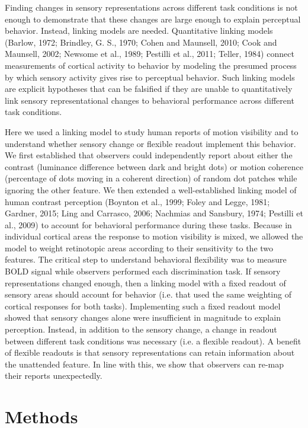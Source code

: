 \documentclass{report}
\begin{document}
Finding changes in sensory representations across different task conditions is not enough to demonstrate that these changes are large enough to explain perceptual behavior.  Instead, linking models are needed. Quantitative linking models (Barlow, 1972; Brindley, G. S., 1970; Cohen and Maunsell, 2010; Cook and Maunsell, 2002; Newsome et al., 1989; Pestilli et al., 2011; Teller, 1984) connect measurements of cortical activity to behavior by modeling the presumed process by which sensory activity gives rise to perceptual behavior. Such linking models are explicit hypotheses that can be falsified if they are unable to quantitatively link sensory representational changes to behavioral performance across different task conditions.

Here we used a linking model to study human reports of motion visibility and to understand whether sensory change or flexible readout implement this behavior. We first established that observers could independently report about either the contrast (luminance difference between dark and bright dots) or motion coherence (percentage of dots moving in a coherent direction) of random dot patches while ignoring the other feature. We then extended a well-established linking model of human contrast perception (Boynton et al., 1999; Foley and Legge, 1981; Gardner, 2015; Ling and Carrasco, 2006; Nachmias and Sansbury, 1974; Pestilli et al., 2009) to account for behavioral performance during these tasks. Because in individual cortical areas the response to motion visibility is mixed, we allowed the model to weight retinotopic areas according to their sensitivity to the two features. The critical step to understand behavioral flexibility was to measure BOLD signal while observers performed each discrimination task. If sensory representations changed enough, then a linking model with a fixed readout of sensory areas should account for behavior (i.e. that used the same weighting of cortical responses for both tasks). Implementing such a fixed readout model showed that sensory changes alone were insufficient in magnitude to explain perception. Instead, in addition to the sensory change, a change in readout between different task conditions was necessary (i.e. a flexible readout). A benefit of flexible readouts is that sensory representations can retain information about the unattended feature. In line with this, we show that observers can re-map their reports unexpectedly. 

\section{Methods}
\end{document}
